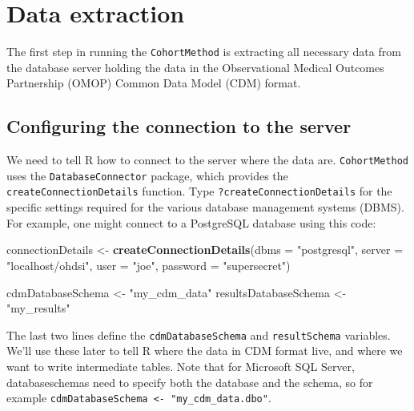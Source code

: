 \documentclass[]{article}
\newenvironment{Shaded}{\begin{snugshade}}{\end{snugshade}}
\newcommand{\DataTypeTok}[1]{\textcolor[rgb]{0.13,0.29,0.53}{#1}}
\newcommand{\KeywordTok}[1]{\textcolor[rgb]{0.13,0.29,0.53}{\textbf{#1}}}
\newcommand{\NormalTok}[1]{#1}
\newcommand{\StringTok}[1]{\textcolor[rgb]{0.31,0.60,0.02}{#1}}
\begin{document}
\hypertarget{data-extraction}{%
\section{Data extraction}\label{data-extraction}}

The first step in running the \texttt{CohortMethod} is extracting all
necessary data from the database server holding the data in the
Observational Medical Outcomes Partnership (OMOP) Common Data Model
(CDM) format.

\hypertarget{configuring-the-connection-to-the-server}{%
\subsection{Configuring the connection to the
server}\label{configuring-the-connection-to-the-server}}

We need to tell R how to connect to the server where the data are.
\texttt{CohortMethod} uses the \texttt{DatabaseConnector} package, which
provides the \texttt{createConnectionDetails} function. Type
\texttt{?createConnectionDetails} for the specific settings required for
the various database management systems (DBMS). For example, one might
connect to a PostgreSQL database using this code:

\begin{Shaded}
\begin{Highlighting}[]
\NormalTok{connectionDetails <-}\StringTok{ }\KeywordTok{createConnectionDetails}\NormalTok{(}\DataTypeTok{dbms =} \StringTok{"postgresql"}\NormalTok{,}
                                             \DataTypeTok{server =} \StringTok{"localhost/ohdsi"}\NormalTok{,}
                                             \DataTypeTok{user =} \StringTok{"joe"}\NormalTok{,}
                                             \DataTypeTok{password =} \StringTok{"supersecret"}\NormalTok{)}

\NormalTok{cdmDatabaseSchema <-}\StringTok{ "my_cdm_data"}
\NormalTok{resultsDatabaseSchema <-}\StringTok{ "my_results"}
\end{Highlighting}
\end{Shaded}

The last two lines define the \texttt{cdmDatabaseSchema} and
\texttt{resultSchema} variables. We'll use these later to tell R where
the data in CDM format live, and where we want to write intermediate
tables. Note that for Microsoft SQL Server, databaseschemas need to
specify both the database and the schema, so for example
\texttt{cdmDatabaseSchema\ \textless{}-\ "my\_cdm\_data.dbo"}.
\end{document}
